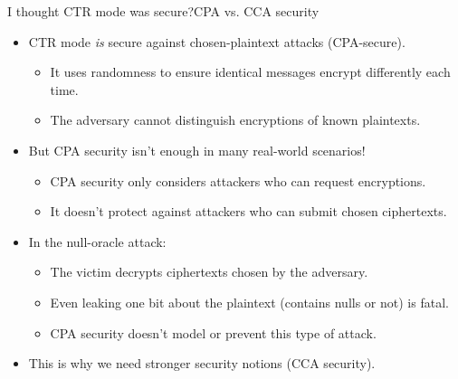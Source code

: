 \documentclass[aspectratio=169, lualatex, handout]{beamer}
\begin{document}
\begin{frame}{I thought CTR mode was secure?}{CPA vs. CCA security}
	\begin{itemize}
		\item CTR mode \textit{is} secure against chosen-plaintext attacks (CPA-secure).
		      \begin{itemize}
			      \item It uses randomness to ensure identical messages encrypt differently each time.
			      \item The adversary cannot distinguish encryptions of known plaintexts.
		      \end{itemize}
		\item But CPA security isn't enough in many real-world scenarios!
		      \begin{itemize}
			      \item CPA security only considers attackers who can request encryptions.
			      \item It doesn't protect against attackers who can submit chosen ciphertexts.
		      \end{itemize}
		\item In the null-oracle attack:
		      \begin{itemize}
			      \item The victim decrypts ciphertexts chosen by the adversary.
			      \item Even leaking one bit about the plaintext (contains nulls or not) is fatal.
			      \item CPA security doesn't model or prevent this type of attack.
		      \end{itemize}
		\item This is why we need stronger security notions (CCA security).
	\end{itemize}
\end{frame}
\end{document}
